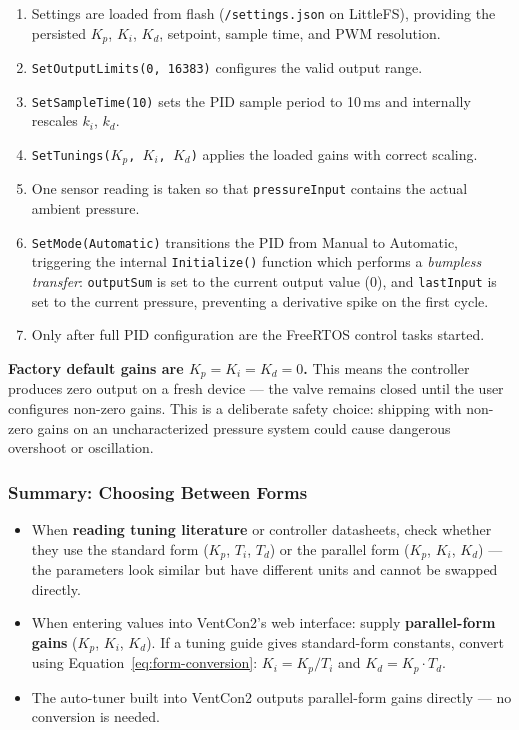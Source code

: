 \documentclass[12pt,a4paper]{article}
\begin{document}
\begin{enumerate}
    \item Settings are loaded from flash (\texttt{/settings.json} on LittleFS), providing the persisted $K_p$, $K_i$, $K_d$, setpoint, sample time, and PWM resolution.
    \item \texttt{SetOutputLimits(0, 16383)} configures the valid output range.
    \item \texttt{SetSampleTime(10)} sets the PID sample period to 10\,ms and internally rescales $k_i$, $k_d$.
    \item \texttt{SetTunings($K_p$, $K_i$, $K_d$)} applies the loaded gains with correct scaling.
    \item One sensor reading is taken so that \texttt{pressureInput} contains the actual ambient pressure.
    \item \texttt{SetMode(Automatic)} transitions the PID from Manual to Automatic, triggering the internal \texttt{Initialize()} function which performs a \emph{bumpless transfer}: \texttt{outputSum} is set to the current output value (0), and \texttt{lastInput} is set to the current pressure, preventing a derivative spike on the first cycle.
    \item Only after full PID configuration are the FreeRTOS control tasks started.
\end{enumerate}

\noindent
\textbf{Factory default gains are $K_p = K_i = K_d = 0$.} This means the controller produces zero output on a fresh device --- the valve remains closed until the user configures non-zero gains. This is a deliberate safety choice: shipping with non-zero gains on an uncharacterized pressure system could cause dangerous overshoot or oscillation.

\subsubsection{Summary: Choosing Between Forms}

\begin{itemize}
    \item When \textbf{reading tuning literature} or controller datasheets, check whether they use the standard form ($K_p$, $T_i$, $T_d$) or the parallel form ($K_p$, $K_i$, $K_d$) --- the parameters look similar but have different units and cannot be swapped directly.
    \item When entering values into VentCon2's web interface: supply \textbf{parallel-form gains} ($K_p$, $K_i$, $K_d$). If a tuning guide gives standard-form constants, convert using Equation~\ref{eq:form-conversion}: $K_i = K_p / T_i$ and $K_d = K_p \cdot T_d$.
    \item The auto-tuner built into VentCon2 outputs parallel-form gains directly --- no conversion is needed.
\end{itemize}
\end{document}
